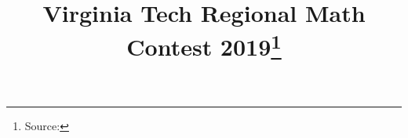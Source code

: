\documentclass[10pt]{article}
\begin{document}
\title{Virginia Tech Regional Math Contest 2019\footnote{Source: \source}}
\author{\vspace{-2ex}}
\date{\vspace{-6ex}} %
\maketitle







\end{document}
